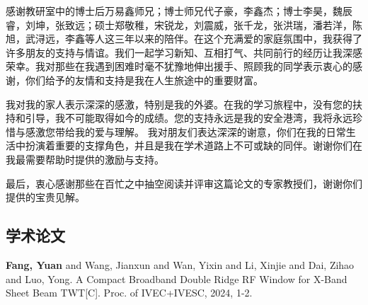 \documentclass[master]{thesis-uestc}
\begin{document}
感谢教研室中的博士后万易鑫师兄；博士师兄代子豪，李鑫杰；博士李昊，魏辰睿，刘坤，张致远；硕士郑敬稚，宋锐龙，刘震威，张千龙，张洪瑞，潘若洋，陈旭，武浔远，李鑫等人这三年以来的陪伴。在这个充满爱的家庭氛围中，我获得了许多朋友的支持与情谊。我们一起学习新知、互相打气、共同前行的经历让我深感荣幸。我对那些在我遇到困难时毫不犹豫地伸出援手、照顾我的同学表示衷心的感谢，你们给予的友情和支持是我在人生旅途中的重要财富。

我对我的家人表示深深的感激，特别是我的外婆。在我的学习旅程中，没有您的扶持和引导，我不可能取得如今的成绩。您的支持永远是我的安全港湾，我将永远珍惜与感激您带给我的爱与理解。
我对朋友们表达深深的谢意，你们在我的日常生活中扮演着重要的支撑角色，并且是我在学术道路上不可或缺的同伴。谢谢你们在我最需要帮助时提供的激励与支持。


最后，衷心感谢那些在百忙之中抽空阅读并评审这篇论文的专家教授们，谢谢你们提供的宝贵见解。





\begin{thesistheaccomplish}
    \section{学术论文}
     \textbf{Fang, Yuan} and Wang, Jianxun and Wan, Yixin and Li, Xinjie and Dai, Zihao and Luo, Yong. A Compact Broadband Double Ridge RF Window for X-Band Sheet Beam TWT[C]. Proc. of IVEC+IVESC, 2024, 1-2.
\end{thesistheaccomplish}


\end{document}
